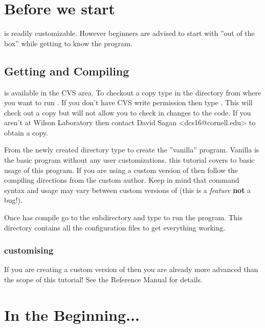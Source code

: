 \documentclass{book}
\begin{document}
\setlength{\parskip}{\dPar}
\setlength{\parindent}{0ex}

\chapter{Before we start}
\label{c:before_beginning}

\tao is readily customizable. However beginners are advised to start with
''out of the box'' \tao while getting to know the program.

\section{Getting and Compiling \tao}

\tao is available in the \cesr CVS area. To checkout a copy type  in the directory from where you want to run \tao. If you don't have \cesr
CVS write permission then type . This will check out a copy
but will not allow you to check in changes to the code. If you aren't at Wilson
Laboratory then contact David Sagan <dcs16@cornell.edu> to obtain a copy. 

From the newly created  directory type  to create
the ''vanilla'' \tao program. Vanilla \tao is the basic \tao program without any
user customizations. this tutorial covers to basic usage of this program.
If you are using a custom version of \tao then
follow the compiling directions from the custom \tao author. Keep in mind that
command syntax and usage may vary between custom versions of \tao (this is a
\textit{feature} \textbf{not} a bug!).

Once \tao has compile go to the subdirectory  and type
 to run the program. This directory contains all the
configuration files to get everything working.

\subsection{customising \tao}

If you are creating a custom version of \tao then you are already more advanced than
the scope of this tutorial! See the \tao Reference Manual for details.

\chapter{In the Beginning...}
\label{c:beginning}
\end{document}
